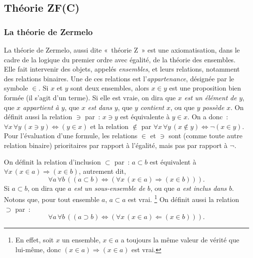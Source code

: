 \subsection{Théorie ZF(C)}

\subsubsection{La théorie de Zermelo}
\label{sub:Zermelo}

La théorie de Zermelo, aussi dite « théorie Z » est une axiomatisation, dans le cadre de la logique du premier ordre avec égalité, de la théorie des ensembles. 
Elle fait intervenir des objets, appelés \textit{ensembles}, et leurs relations, notamment des relations binaires. 
Une de ces relations est l'\textit{appartenance}, désignée par le symbole $\in$. 
Si $x$ et $y$ sont deux ensembles, alors $x \in y$ est une proposition bien formée (il s'agit d'un terme). 
Si elle est vraie, on dira que \textit{$x$ est un élément de $y$}, que \textit{$x$ appartient à $y$}, que \textit{$x$ est dans $y$}, que \textit{$y$ contient $x$}, ou que \textit{$y$ possède $x$}.
On définit aussi la relation $\ni$ par : $x \ni y$ est équivalente à $y \in x$. 
On a donc : $\forall x \, \forall y \, (x \ni y) \Leftrightarrow (y \in x)$ et la relation $\notin$ par $\forall x \, \forall y \, (x \notin y) \Leftrightarrow \neg (x \in y)$. 
Pour l'évaluation d'une formule, les relations $\in$ et $\ni$ sont (comme toute autre relation binaire) prioritaires par rapport à l'égalité, mais pas par rapport à $\neg$.

On définit la relation d'inclusion $\subset$ par : $a \subset b$ est équivalent à $\forall x \, (x \in a) \Rightarrow (x \in b)$, autrement dit,
\begin{equation*}
    \forall a \, \forall b \, (
        (a \subset b) \Leftrightarrow (\forall x \, (x \in a) \Rightarrow (x \in b))
    ). 
\end{equation*}
Si $a \subset b$, on dira que \textit{$a$ est un sous-ensemble de $b$}, ou que \textit{$a$ est inclus dans $b$}.
Notons que, pour tout ensemble $a$, $a \subset a$ est vrai.%
\footnote{En effet, soit $x$ un ensemble, $x \in a$ a toujours la même valeur de vérité que lui-même, donc $(x \in a) \Rightarrow (x \in a)$ est vrai.}
On définit aussi la relation $\supset$ par :
\begin{equation*}
    \forall a \, \forall b \, (
        (a \supset b) \Leftrightarrow (\forall x \, (x \in a) \Leftarrow (x \in b))
    ). 
\end{equation*}

